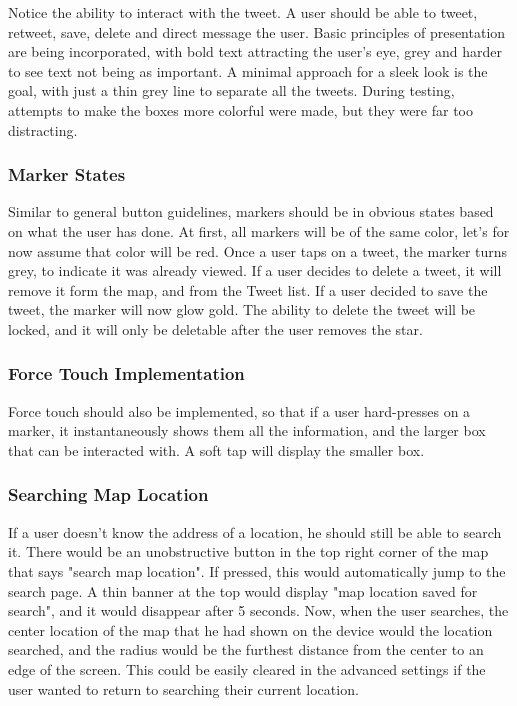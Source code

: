 \documentclass[11pt]{article}
\begin{document}
Notice the ability to interact with the tweet. A user should be able to tweet, retweet, save, delete and direct message the user. Basic principles of presentation are being incorporated, with bold text attracting the user's eye, grey and harder to see text not being as important. A minimal approach for a sleek look is the goal, with just a thin grey line to separate all the tweets. During testing, attempts to make the boxes more colorful were made, but they were far too distracting.

\subsubsection{Marker States}
Similar to general button guidelines, markers should be in obvious states based on what the user has done. At first, all markers will be of the same color, let's for now assume that color will be red. Once a user taps on a tweet, the marker turns grey, to indicate it was already viewed. If a user decides to delete a tweet, it will remove it form the map, and from the Tweet list. If a user decided to save the tweet, the marker will now glow gold. The ability to delete the tweet will be locked, and it will only be deletable after the user removes the star.

\subsubsection{Force Touch Implementation}
Force touch should also be implemented, so that if a user hard-presses on a marker, it instantaneously shows them all the information, and the larger box that can be interacted with. A soft tap will display the smaller box.

\subsubsection{Searching Map Location}
If a user doesn't know the address of a location, he should still be able to search it. There would be an unobstructive button in the top right corner of the map that says "search map location". If pressed, this would automatically jump to the search page. A thin banner at the top would display "map location saved for search", and it would disappear after 5 seconds. Now, when the user searches, the center location of the map that he had shown on the device would the location searched, and the radius would be the furthest distance from the center to an edge of the screen. This could be easily cleared in the advanced settings if the user wanted to return to searching their current location.
\end{document}
